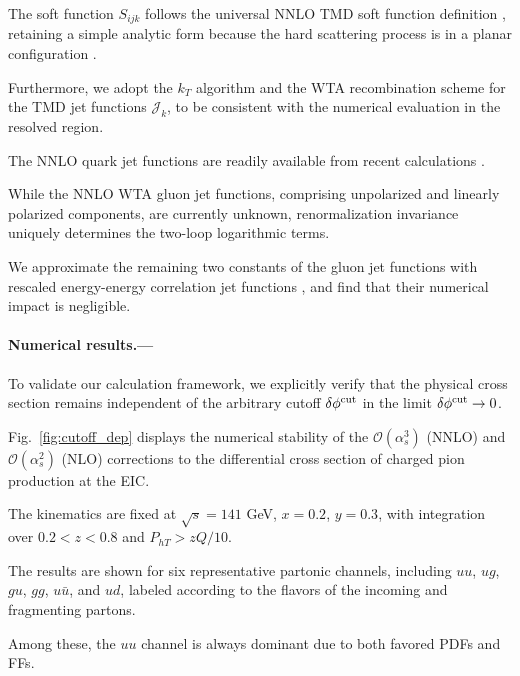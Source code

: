 \documentclass[prl,aps,twocolumn,superscriptaddress]{revtex4}
\begin{document}
The soft function $S_{ijk}$ follows the universal NNLO TMD soft function definition \cite{Echevarria:2015byo, Lubbert:2016rku}, retaining a simple analytic form because the hard scattering process is in a planar configuration  \cite{Gao:2019ojf, Chien:2020hzh, Chien:2022wiq, Gao:2023ivm, Fu:2024fgj}.



Furthermore, we adopt the $k_T$ algorithm and the WTA recombination scheme for the TMD jet functions $\mathcal{J}_k$, to be consistent with the numerical evaluation in the resolved region.

The NNLO quark jet functions are readily available from recent calculations \cite{Gutierrez-Reyes:2019vbx, Fang:2024auf, Bell:2021dpb, Brune:2022cgr, Buonocore:2025ysd}.

While the NNLO WTA gluon jet functions, comprising unpolarized and linearly polarized components, are currently unknown, renormalization invariance uniquely determines the two-loop logarithmic terms.

We approximate the remaining two constants of the gluon jet functions with rescaled energy-energy correlation jet functions \cite{Luo:2019hmp,Luo:2019bmw}, and find that their numerical impact is negligible.



\paragraph*{Numerical results.---}

To validate our calculation framework, we explicitly verify that the physical cross section remains independent of the arbitrary cutoff $\delta\phi^{\rm cut}$ in the limit $\delta\phi^{\rm cut}\to 0$.

Fig.~\ref{fig:cutoff_dep} displays the numerical stability of the $\mathcal{O}(\alpha_s^3)$ (NNLO) and $\mathcal{O}(\alpha_s^2)$ (NLO) corrections to the differential cross section of charged pion production at the EIC.

The kinematics are fixed at $\sqrt{s}=141$ GeV, $x=0.2$, $y=0.3$, with integration over $0.2<z<0.8$ and $P_{hT} > z Q/10$.

The results are shown for six representative partonic channels, including $uu$, $ug$, $gu$, $gg$, $u\bar u$, and $u d$, labeled according to the flavors of the incoming and fragmenting partons.

Among these, the $uu$ channel is always dominant due to both favored PDFs and FFs.
\end{document}
